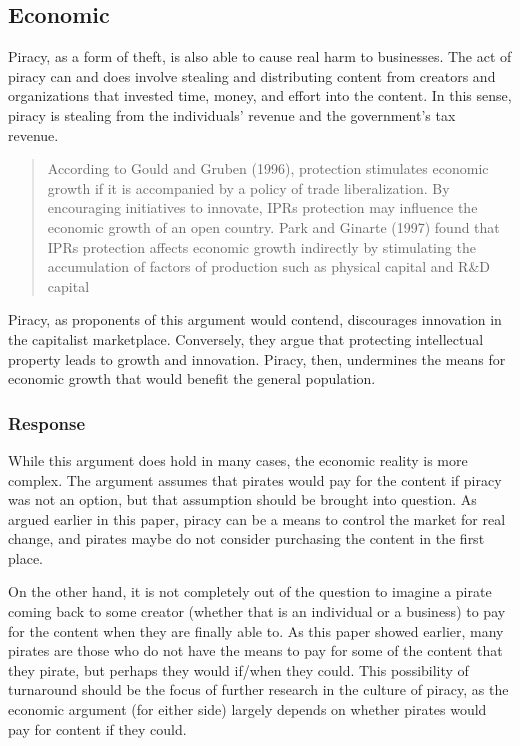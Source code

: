 \documentclass[onecolumn, 12pt]{article}
\begin{document}
\subsection{Economic}
Piracy, as a form of theft, is also able to cause real harm to businesses. The
act of piracy can and does involve stealing and distributing content from
creators and organizations that invested time, money, and effort into the
content. In this sense, piracy is stealing from the individuals' revenue and
the government's tax revenue.~\cite{congress:pirating-the-american-dream}

\blockcquote{mrad:effects-of-ip}[.]{%
  According to Gould and Gruben (1996),
   protection stimulates economic
  growth if it is accompanied by a policy of trade liberalization. By
  encouraging initiatives to innovate, IPRs protection may influence the
  economic growth of an open country. Park and Ginarte (1997) found that IPRs
  protection affects economic growth indirectly by stimulating the accumulation
  of factors of production such as physical capital and R\&D capital%
}
Piracy, as proponents of this argument would contend, discourages innovation in
the capitalist marketplace. Conversely, they argue that protecting intellectual
property leads to growth and innovation. Piracy, then, undermines the means for
economic growth that would benefit the general population.

\subsubsection{Response}
While this argument does hold in many cases, the economic reality is more
complex. The argument assumes that pirates would pay for the content if piracy
was not an option, but that assumption should be brought into question. As
argued earlier in this paper, piracy can be a means to control the market for
real change, and pirates maybe do not consider purchasing the content in the
first place.

On the other hand, it is not completely out of the question to imagine a
pirate coming back to some creator (whether that is an individual or a
business) to pay for the content when they are finally able to. As this paper
showed earlier, many pirates are those who do not have the means to pay for
some of the content that they pirate, but perhaps they would if/when they
could. This possibility of turnaround should be the focus of further research
in the culture of piracy, as the economic argument (for either side) largely
depends on whether pirates would pay for content if they could.
\end{document}
